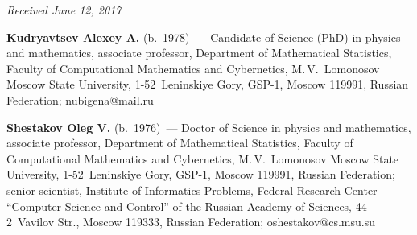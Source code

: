 \vspace*{-6pt}

\hfill{\small\textit{Received June 12, 2017}}



\Contr

\noindent
\textbf{Kudryavtsev Alexey A.} (b.\ 1978)~--- 
Candidate of Science (PhD) in physics and mathematics, associate professor, 
Department of Mathematical Statistics, Faculty of Computational Mathematics 
and Cybernetics, M.\,V.~Lomonosov Moscow State University, 1-52~Leninskiye Gory, 
GSP-1, Moscow 119991, Russian Federation; \mbox{nubigena@mail.ru}

\vspace*{3pt}

\noindent
\textbf{Shestakov Oleg V.} (b.\ 1976)~--- 
Doctor of Science in physics and mathematics, associate professor, 
Department of Mathematical Statistics, Faculty of Computational Mathematics 
and Cybernetics, M.\,V.~Lomonosov Moscow State University, 1-52~Leninskiye Gory, 
GSP-1, Moscow 119991, Russian Federation; senior scientist, 
Institute of Informatics Problems, Federal Research Center ``Computer Science 
and Control'' of the Russian Academy of Sciences, 44-2~Vavilov Str., Moscow 119333, 
Russian Federation; \mbox{oshestakov@cs.msu.su}
\label{end\stat}


\renewcommand{\bibname}{\protect\rm Литература} 